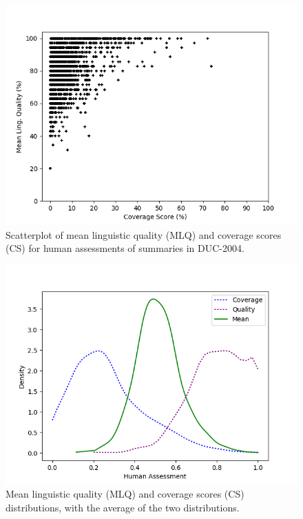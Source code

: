 \documentclass[11pt,a4paper]{article}
\begin{document}
\begin{figure}[ht]
\centering
\includegraphics[scale=0.5]{../../my_diagrams/DUC_dataset/scatter_CS_MLQ.png}
\caption{Scatterplot of mean linguistic quality (\textsc{MLQ}) and coverage scores (\textsc{CS}) for human assessments of summaries in DUC-2004.}
\label{graph:scatterplot}
\end{figure}

\begin{figure}[ht]
\centering
\includegraphics[scale=0.5]{../../my_diagrams/DUC_dataset/density_plots.png}
\caption{Mean linguistic quality (\textsc{MLQ}) and coverage scores (\textsc{CS}) distributions, with the average of the two distributions.}
\label{graph:density}
\end{figure}
\end{document}
